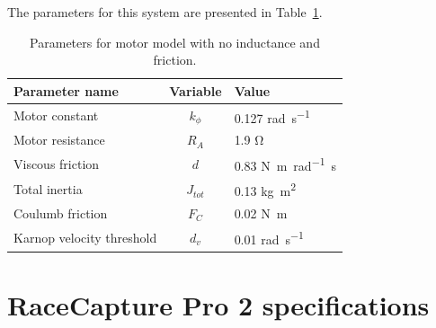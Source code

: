 The parameters for this system are presented in Table~\ref{table:model2table}.
\begin{table}[H]
\caption{Parameters for motor model with no inductance and friction.}
\label{table:model2table}
\begin{center}
\begin{tabular}{lcl}
\textbf{Parameter name} & \textbf{Variable} & \textbf{Value}\\
\toprule
Motor constant & $k_{\phi}$ & 0.127 \si{\radian\per\second} \\
Motor resistance & $R_A$ & 1.9 \si{\ohm} \\
Viscous friction & $d$ & 0.83 \si{\newton\meter\per\radian\second} \\
Total inertia & $J_{tot}$ & 0.13 \si{\kilogram\meter^{2}} \\
Coulumb friction & $F_C$ & 0.02 \si{\newton\meter} \\
Karnop velocity threshold & $d_v$ & 0.01 \si{\radian\per\second} \\
\bottomrule
\end{tabular}
\end{center}
\end{table}











\chapter{RaceCapture Pro 2 specifications}\label{app:RCP}

